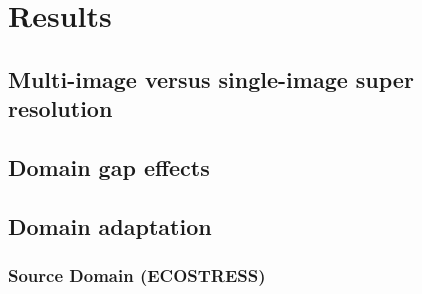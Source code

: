 \section{Results}\label{sec:results}

    \subsection{Multi-image versus single-image super resolution}

    \subsection{Domain gap effects}

    \subsection{Domain adaptation}

        \subsubsection{Source Domain (ECOSTRESS)}

